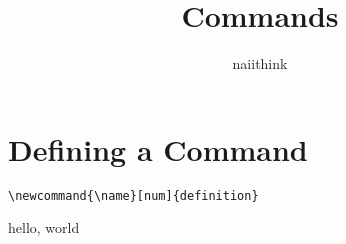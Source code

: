 \documentclass[a4paper]{article}
\title{Commands}
\author{naiithink}
\date{}
\newcommand{\sayhello}{hello}
\renewcommand{\sayhello}{hello, world}
\begin{document}
\maketitle

\newpage
\section{Defining a Command}

\verb|\newcommand{\name}[num]{definition}|

\sayhello
\end{document}
